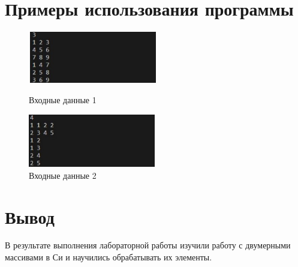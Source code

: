 \documentclass[a4paper,12pt]{report}
\begin{document}
\begin{centering}
\end{centering}
\newpage

\section*{Примеры использования программы}
    \begin{figure}[h]
        \includegraphics[width=0.5\textwidth]{ex1.jpg}
    \caption{Входные данные 1}
    \label{ris:image1}
            
        \includegraphics[width=0.5\textwidth]{ex2.jpg}
    \caption{Входные данные 2}
    \label{ris:image2}
    
    \end{figure}

\section*{Вывод}
В результате выполнения лабораторной работы изучили работу с двумерными массивами в Си и научились обрабатывать их элементы.
\end{document}
